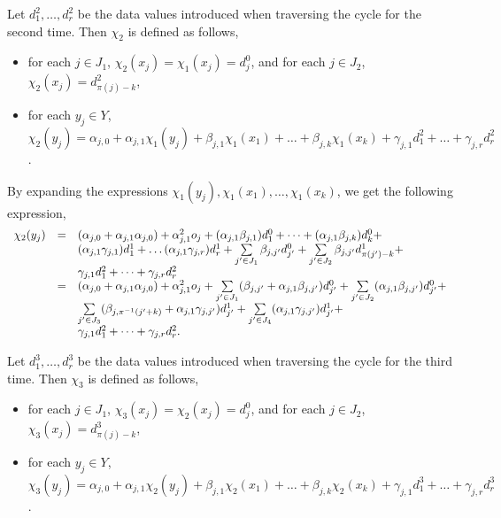 \documentclass[runningheads,a4paper]{llncs}
\begin{document}
Let $d^2_{1},\dots,d^2_{r}$ be the data values introduced when traversing the cycle for the second time. Then $\chi_2$ is defined as follows,
\begin{itemize}
\item for each $j \in J_1$, $\chi_2(x_j)=\chi_1(x_j)=d^0_j$, and for each $j \in J_2$, $\chi_2(x_j) =d^2_{\pi(j)-k}$, 
%
\item for each $y_j \in Y$, $\chi_2(y_j) = \alpha_{j,0} + \alpha_{j,1} \chi_1(y_j) + \beta_{j,1} \chi_1(x_1) + \dots + \beta_{j,k} \chi_1(x_k) + \gamma_{j,1} d^2_1 +\dots + \gamma_{j,r} d^2_{r}$.
\end{itemize}

By expanding the expressions $\chi_1(y_j), \chi_1(x_1),\dots,\chi_1(x_k)$, we get the following expression,
\[
\begin{array}{l c l}
\chi_2(y_j)  & = & (\alpha_{j,0} + \alpha_{j,1} \alpha_{j,0}) + \alpha^2_{j,1} o_j + (\alpha_{j,1} \beta_{j,1}) d^0_{1} +\dots + (\alpha_{j,1}\beta_{j,k}) d^0_{k} + \\
& & (\alpha_{j,1} \gamma_{j,1}) d^1_1 + \dots (\alpha_{j,1} \gamma_{j,r}) d^1_r + \sum \limits_{j' \in J_1} \beta_{j,j'} d^0_{j'} + \sum \limits_{j' \in J_2} \beta_{j,j'} d^1_{\pi(j')-k} + \\
& &  \gamma_{j,1} d^2_1 + \dots + \gamma_{j,r} d^2_{r}\\
& = & (\alpha_{j,0} + \alpha_{j,1} \alpha_{j,0}) + \alpha^2_{j,1} o_j + \sum \limits_{j' \in J_1} (\beta_{j,j'} + \alpha_{j,1}  \beta_{j,j'}) d^0_{j'} + \sum \limits_{j' \in J_2} (\alpha_{j,1}\beta_{j,j'}) d^0_{j'} +\\
& &  \sum \limits_{j' \in J_3} (\beta_{j, \pi^{-1}(j'+k)}+\alpha_{j,1}\gamma_{j,j'}) d^1_{j'} + \sum \limits_{j' \in J_4} (\alpha_{j,1} \gamma_{j,j'}) d^1_{j'} +\\
& & \gamma_{j, 1} d^2_{1} + \dots + \gamma_{j,r} d^2_{r}.
\end{array} 
\]

Let $d^3_{1},\dots,d^3_{r}$ be the data values introduced when traversing the cycle for the third time. Then $\chi_3$ is defined as follows, 
\begin{itemize}
\item for each $j \in J_1$, $\chi_3(x_j)=\chi_2(x_j)=d^0_j$, and for each $j \in J_2$, $\chi_3(x_j) =d^3_{\pi(j)-k}$, 
%
\item for each $y_j \in Y$, $\chi_3(y_j) = \alpha_{j,0} + \alpha_{j,1} \chi_2(y_j) + \beta_{j,1} \chi_2(x_1) + \dots + \beta_{j,k} \chi_2(x_k) + \gamma_{j,1} d^3_{1} + \dots + \gamma_{j,r} d^3_{r}$.
\end{itemize}
\end{document}
